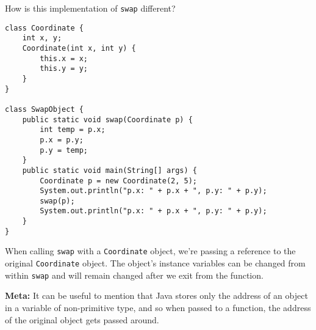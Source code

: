 \begin{blocksection}
\question How is this implementation of \lstinline$swap$ different?

\begin{lstlisting}
class Coordinate {
    int x, y;
    Coordinate(int x, int y) {
        this.x = x;
        this.y = y;
    }
}

class SwapObject {
    public static void swap(Coordinate p) {
        int temp = p.x;
        p.x = p.y;
        p.y = temp;
    }
    public static void main(String[] args) {
        Coordinate p = new Coordinate(2, 5);
        System.out.println("p.x: " + p.x + ", p.y: " + p.y);
        swap(p);
        System.out.println("p.x: " + p.x + ", p.y: " + p.y);
    }
}
\end{lstlisting}

\begin{solution}
When calling \lstinline$swap$ with a \lstinline$Coordinate$ object, we're
passing a reference to the original \lstinline$Coordinate$ object. The object's
instance variables can be changed from within \lstinline$swap$ and will remain
changed after we exit from the function.

\textbf{Meta:} It can be useful to mention that Java stores only the address of
an object in a variable of non-primitive type, and so when passed to a
function, the address of the original object gets passed around.
\end{solution}
\end{blocksection}
